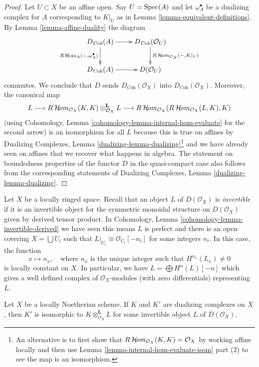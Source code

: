 \begin{proof}
Let $U \subset X$ be an affine open. Say $U = \mathop{\mathrm{Spec}}(A)$ and
let $\omega_A^\bullet$ be a dualizing complex for $A$
corresponding to $K|_U$
as in Lemma \ref{lemma-equivalent-definitions}.
By Lemma \ref{lemma-affine-duality} the diagram
$$
\xymatrix{
D_{\textit{Coh}}(A) \ar[r] \ar[d]_{R\Hom_A(-, \omega_A^\bullet)} &
D_{\textit{Coh}}(\mathcal{O}_U) \ar[d]^{R\SheafHom_{\mathcal{O}_X}(-, K|_U)} \\
D_{\textit{Coh}}(A) \ar[r] &
D(\mathcal{O}_U)
}
$$
commutes. We conclude that $D$ sends $D_{\textit{Coh}}(\mathcal{O}_X)$ into
$D_{\textit{Coh}}(\mathcal{O}_X)$. Moreover, the canonical map
$$
L
\longrightarrow
R\mathop{\mathcal{H}\!\mathit{om}}\nolimits_{\mathcal{O}_X}(K, K) \otimes_{\mathcal{O}_X}^\mathbf{L} L
\longrightarrow
R\mathop{\mathcal{H}\!\mathit{om}}\nolimits_{\mathcal{O}_X}(R\mathop{\mathcal{H}\!\mathit{om}}\nolimits_{\mathcal{O}_X}(L, K), K)
$$
(using Cohomology, Lemma \ref{cohomology-lemma-internal-hom-evaluate}
for the second arrow)
is an isomorphism for all $L$ because this is true on affines by
Dualizing Complexes, Lemma \ref{dualizing-lemma-dualizing}\footnote{An
alternative is to first show that
$R\mathop{\mathcal{H}\!\mathit{om}}\nolimits_{\mathcal{O}_X}(K, K) = \mathcal{O}_X$ by
working affine locally and then use
Lemma \ref{lemma-internal-hom-evaluate-isom} part (2)
to see the map is an isomorphism.}
and we have already seen on affines that we recover what
happens in algebra.
The statement on boundedness properties of the functor $D$
in the quasi-compact case also follows from the corresponding
statements of Dualizing Complexes, Lemma \ref{dualizing-lemma-dualizing}.
\end{proof}

\noindent
Let $X$ be a locally ringed space. Recall that an object $L$ of
$D(\mathcal{O}_X)$ is {\it invertible} if it is an invertible object
for the symmetric monoidal structure on $D(\mathcal{O}_X)$ given
by derived tensor product. In
Cohomology, Lemma \ref{cohomology-lemma-invertible-derived}
we have seen this means $L$ is perfect and there is an open covering
$X = \bigcup U_i$ such that $L|_{U_i} \cong \mathcal{O}_{U_i}[-n_i]$
for some integers $n_i$. In this case, the function
$$
x \mapsto n_x,\quad
\text{where }n_x\text{ is the unique integer such that }
H^{n_x}(L_x) \not = 0
$$
is locally constant on $X$. In particular, we have
$L = \bigoplus H^n(L)[-n]$ which gives a well defined complex of
$\mathcal{O}_X$-modules (with zero differentials) representing $L$.

\begin{lemma}
\label{lemma-dualizing-unique-schemes}
Let $X$ be a locally Noetherian scheme. If $K$ and $K'$ are dualizing
complexes on $X$, then $K'$ is isomorphic to
$K \otimes_{\mathcal{O}_X}^\mathbf{L} L$
for some invertible object $L$ of $D(\mathcal{O}_X)$.
\end{lemma}

